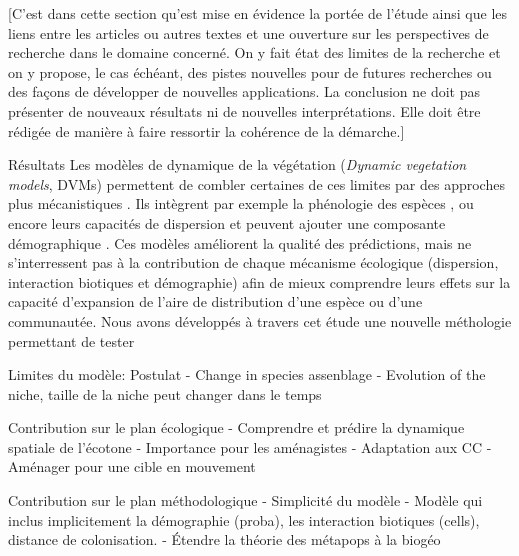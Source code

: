 [C’est dans cette section qu’est mise en évidence la portée de l’étude ainsi que les liens entre les articles ou autres textes et une ouverture sur les perspectives de recherche dans le domaine concerné. On y fait état des limites de la recherche et on y propose, le cas échéant, des pistes nouvelles pour de futures recherches ou des façons de développer de nouvelles applications. La conclusion ne doit pas présenter de nouveaux résultats ni de nouvelles interprétations. Elle doit être rédigée de manière à faire ressortir la cohérence de la démarche.]

Résultats
Les modèles de dynamique de la végétation
(\textit{Dynamic vegetation models}, DVMs) permettent de combler certaines de ces limites par des
approches plus mécanistiques \citep{Snell2014a}. Ils intègrent par exemple la phénologie des espèces
\citep{Letters2001,Morin2008}, ou encore leurs capacités de dispersion \citep{Nobis2014,Iverson2004}
et peuvent ajouter une composante démographique \citep{Lischke2006a,Vanderwel2014}. Ces modèles
améliorent la qualité des prédictions, mais ne s'interressent pas à la contribution de chaque
mécanisme écologique (dispersion, interaction biotiques et démographie) afin de mieux comprendre
leurs effets sur la capacité d'expansion de l'aire de distribution d'une espèce ou d'une
communautée. Nous avons développés à travers cet étude une nouvelle méthologie permettant de tester

Limites du modèle:
Postulat
- Change in species assenblage
- Evolution of the niche, taille de la niche peut changer dans le temps

Contribution sur le plan écologique
- Comprendre et prédire la dynamique spatiale de l'écotone
- Importance pour les aménagistes
- Adaptation aux CC
- Aménager pour une cible en mouvement

Contribution sur le plan méthodologique
- Simplicité du modèle
- Modèle qui inclus implicitement la démographie (proba), les interaction biotiques (cells), distance de colonisation.
- Étendre la théorie des métapops à la biogéo

